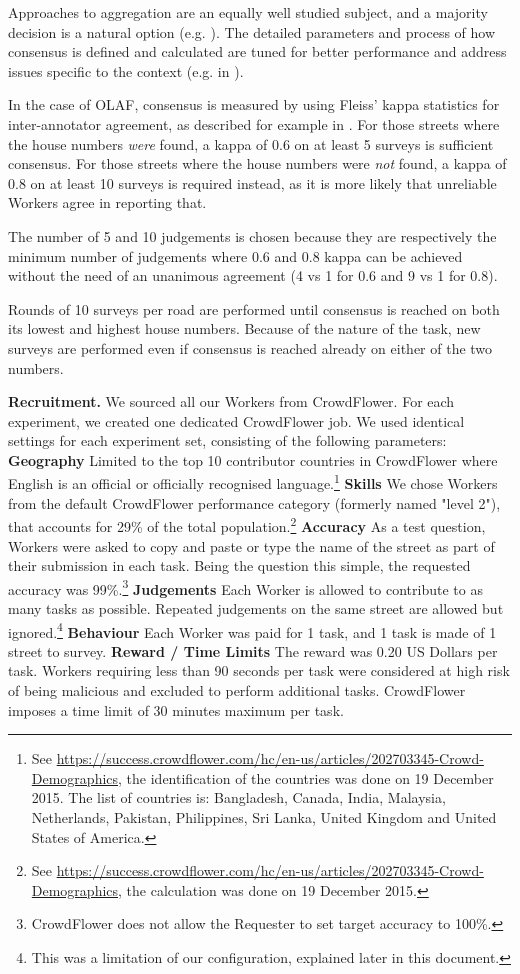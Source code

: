 Approaches to aggregation are an equally well studied subject, and a majority decision is a natural option (e.g. \cite{Le:2010ug}). The detailed parameters and process of how consensus is defined and calculated are tuned for better performance and address issues specific to the context (e.g. in \cite{Hirth:2011fh}). 

In the case of OLAF, consensus is measured by using Fleiss' kappa statistics for inter-annotator agreement, as described for example in \cite{Nowak:2010gt}. For those streets where the house numbers {\it were} found, a kappa of 0.6 on at least 5 surveys is sufficient consensus. For those streets where the house numbers were {\it not} found, a kappa of 0.8 on at least 10 surveys is required instead, as it is more likely that unreliable Workers agree in reporting that.

The number of 5 and 10 judgements is chosen because they are respectively the minimum number of judgements where 0.6 and 0.8 kappa can be achieved without the need of an unanimous agreement (4 vs 1 for 0.6 and 9 vs 1 for 0.8). 

Rounds of 10 surveys per road are performed until consensus is reached on both its lowest and highest house numbers. Because of the nature of the task, new surveys are performed even if consensus is reached already on either of the two numbers.  

\textbf{Recruitment.} We sourced all our Workers from CrowdFlower. For each experiment, we created one dedicated CrowdFlower job. We used identical settings for each experiment set, consisting of the following parameters: \textbf{Geography} Limited to the top 10 contributor countries in CrowdFlower where English is an official or officially recognised language.\footnote{See \url{https://success.crowdflower.com/hc/en-us/articles/202703345-Crowd-Demographics}, the identification of the countries was done on 19 December 2015. The list of countries is: Bangladesh, Canada, India, Malaysia, Netherlands, Pakistan, Philippines, Sri Lanka, United Kingdom and United States of America.} \textbf{Skills} We chose Workers from the default CrowdFlower performance category (formerly named "level 2"), that accounts for 29\% of the total population.\footnote{See \url{https://success.crowdflower.com/hc/en-us/articles/202703345-Crowd-Demographics}, the calculation was done on 19 December 2015.} \textbf{Accuracy} As a test question, Workers were asked to copy and paste or type the name of the street as part of their submission in each task. Being the question this simple, the requested accuracy was 99\%.\footnote{CrowdFlower does not allow the Requester to set target accuracy to 100\%.} \textbf{Judgements} Each Worker is allowed to contribute to as many tasks as possible. Repeated judgements on the same street are allowed but ignored.\footnote{This was a limitation of our configuration, explained later in this document.} \textbf{Behaviour} Each Worker was paid for 1 task, and 1 task is made of 1 street to survey. \textbf{Reward / Time Limits} The reward was 0.20 US Dollars per task. Workers requiring less than 90 seconds per task were considered at high risk of being malicious and excluded to perform additional tasks. CrowdFlower imposes a time limit of 30 minutes maximum per task.

